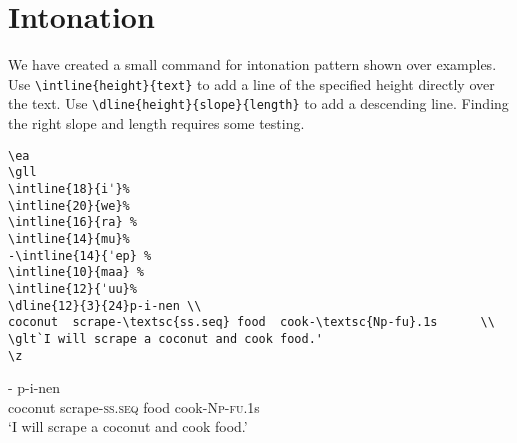 % 

\section{Intonation}
We have created a small command for intonation pattern shown over examples. Use \verb+\intline{height}{text}+ to add a line of the specified height directly over the text. Use \verb+\dline{height}{slope}{length}+ to add a descending line. Finding the right slope and length requires some testing. 

\newpage 
\begin{verbatim} 
\ea  
\gll
\intline{18}{iˈ}%
\intline{20}{we}%
\intline{16}{ra} %
\intline{14}{mu}%
-\intline{14}{ˈep} %
\intline{10}{maa} % 
\intline{12}{ˈuu}%
\dline{12}{3}{24}p-i-nen \\
coconut  scrape-\textsc{ss.seq} food  cook-\textsc{Np-fu}.1s      \\
\glt`I will scrape a coconut and cook food.'
\z 
\end{verbatim}

\ea  
\gll
{}%
%
%
- %
%
p-i-nen \\
coconut  scrape-\textsc{ss.seq} food  cook-\textsc{Np-fu}.1s      \\
\glt`I will scrape a coconut and cook food.'
\z 